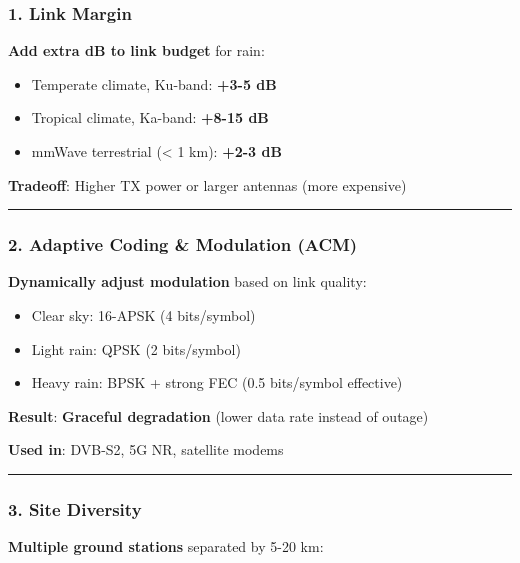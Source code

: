 \subsubsection{1. Link Margin}\label{link-margin}

\textbf{Add extra dB to link budget} for rain:

\begin{itemize}
\tightlist
\item
  Temperate climate, Ku-band: \textbf{+3-5 dB}
\item
  Tropical climate, Ka-band: \textbf{+8-15 dB}
\item
  mmWave terrestrial (\textless{} 1 km): \textbf{+2-3 dB}
\end{itemize}

\textbf{Tradeoff}: Higher TX power or larger antennas (more expensive)

\begin{center}\rule{0.5\linewidth}{0.5pt}\end{center}

\subsubsection{2. Adaptive Coding \& Modulation
(ACM)}\label{adaptive-coding-modulation-acm}

\textbf{Dynamically adjust modulation} based on link quality:

\begin{itemize}
\tightlist
\item
  Clear sky: 16-APSK (4 bits/symbol)
\item
  Light rain: QPSK (2 bits/symbol)
\item
  Heavy rain: BPSK + strong FEC (0.5 bits/symbol effective)
\end{itemize}

\textbf{Result}: \textbf{Graceful degradation} (lower data rate instead
of outage)

\textbf{Used in}: DVB-S2, 5G NR, satellite modems

\begin{center}\rule{0.5\linewidth}{0.5pt}\end{center}

\subsubsection{3. Site Diversity}\label{site-diversity}

\textbf{Multiple ground stations} separated by 5-20 km:

